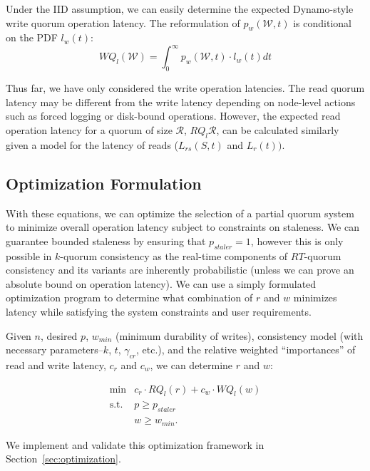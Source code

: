 \documentclass{vldb}
\begin{document}
Under the IID assumption, we can easily determine the expected Dynamo-style write quorum operation latency. The reformulation of $p_w(\mathcal{W}, t)$ is conditional on the PDF $l_w(t)$:
\begin{equation}
WQ_l(\mathcal{W}) = \int_0^{\infty} p_w(\mathcal{W}, t) \cdot l_w(t) dt
\end{equation}

Thus far, we have only considered the write operation latencies.  The
read quorum latency may be different from the write latency depending
on node-level actions such as forced logging or disk-bound operations.
However, the expected read operation latency for a quorum of size
$\mathcal{R}$, $RQ_l{\mathcal{R}}$, can be calculated similarly given a
model for the latency of reads ($L_{rs}(S,t)$ and $L_r(t))$.

\subsection{Optimization Formulation}

With these equations, we can optimize the selection of a partial
quorum system to minimize overall operation latency subject to
constraints on staleness. We can guarantee bounded staleness by
ensuring that $p_{staler} = 1$, however this is only possible in
$k$-quorum consistency as the real-time components of $RT$-quorum
consistency and its variants are inherently probabilistic (unless we
can prove an absolute bound on operation latency).  We can use a
simply formulated optimization program to determine what combination
of $r$ and $w$ minimizes latency while satisfying the system
constraints and user requirements.

Given $n$, desired $p$, $w_{min}$ (minimum durability of writes),
consistency model (with necessary parameters--$k$, $t$, $\gamma_{cr}$,
etc.), and the relative weighted ``importances'' of read
and write latency, $c_r$ and $c_w$, we can determine $r$ and $w$:

\begin{equation}
 \begin{array}{rl}
    \min        & c_r\cdot RQ_l(r) +c_w \cdot WQ_l(w) \\
    \mbox{s.t.} & p \ge p_{staler} \\
                & w \ge w_{min}.
    \end{array}
\end{equation}

We implement and validate this optimization framework in
Section~\ref{sec:optimization}.
\end{document}
